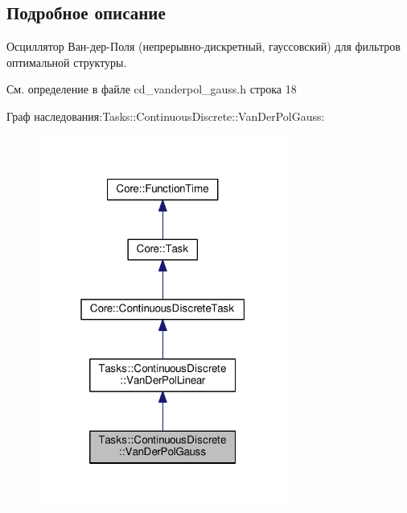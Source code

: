 \subsection{Подробное описание}
Осциллятор Ван-\/дер-\/Поля (непрерывно-\/дискретный, гауссовский) для фильтров оптимальной структуры. 

См. определение в файле cd\+\_\+vanderpol\+\_\+gauss.\+h строка 18



Граф наследования\+:Tasks\+:\+:Continuous\+Discrete\+:\+:Van\+Der\+Pol\+Gauss\+:
\nopagebreak
\begin{figure}[H]
\begin{center}
\leavevmode
\includegraphics[width=232pt]{class_tasks_1_1_continuous_discrete_1_1_van_der_pol_gauss__inherit__graph}
\end{center}
\end{figure}


